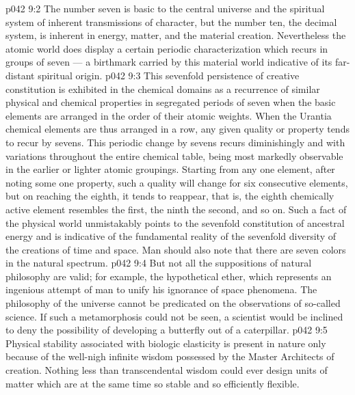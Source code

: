 \vs p042 9:2 The number seven is basic to the central universe and the spiritual system of inherent transmissions of character, but the number ten, the decimal system, is inherent in energy, matter, and the material creation. Nevertheless the atomic world does display a certain periodic characterization which recurs in groups of seven --- a birthmark carried by this material world indicative of its far\hyp{}distant spiritual origin.
\vs p042 9:3 This sevenfold persistence of creative constitution is exhibited in the chemical domains as a recurrence of similar physical and chemical properties in segregated periods of seven when the basic elements are arranged in the order of their atomic weights. When the Urantia chemical elements are thus arranged in a row, any given quality or property tends to recur by sevens. This periodic change by sevens recurs diminishingly and with variations throughout the entire chemical table, being most markedly observable in the earlier or lighter atomic groupings. Starting from any one element, after noting some one property, such a quality will change for six consecutive elements, but on reaching the eighth, it tends to reappear, that is, the eighth chemically active element resembles the first, the ninth the second, and so on. Such a fact of the physical world unmistakably points to the sevenfold constitution of ancestral energy and is indicative of the fundamental reality of the sevenfold diversity of the creations of time and space. Man should also note that there are seven colors in the natural spectrum.
\vs p042 9:4 But not all the suppositions of natural philosophy are valid; for example, the hypothetical ether, which represents an ingenious attempt of man to unify his ignorance of space phenomena. The philosophy of the universe cannot be predicated on the observations of so\hyp{}called science. If such a metamorphosis could not be seen, a scientist would be inclined to deny the possibility of developing a butterfly out of a caterpillar.
\vs p042 9:5 Physical stability associated with biologic elasticity is present in nature only because of the well\hyp{}nigh infinite wisdom possessed by the Master Architects of creation. Nothing less than transcendental wisdom could ever design units of matter which are at the same time so stable and so efficiently flexible.
